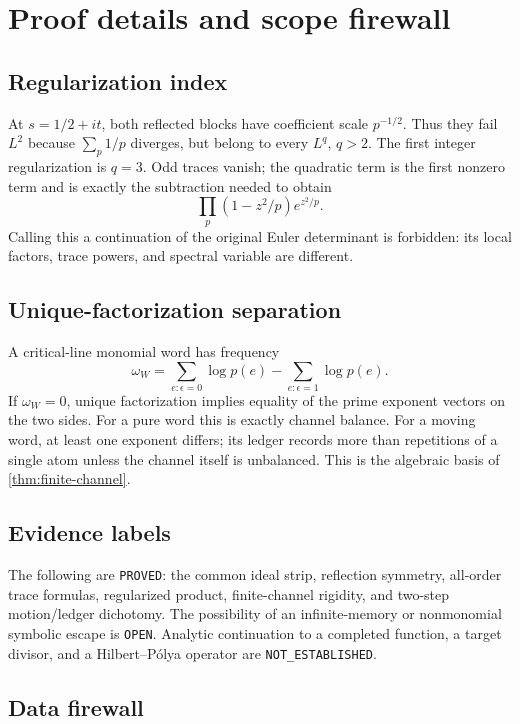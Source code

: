 \section{Proof details and scope firewall}
\label{app:scope}

\subsection{Regularization index}

At $s=1/2+it$, both reflected blocks have coefficient scale $p^{-1/2}$.
Thus they fail $L^2$ because $\sum_p1/p$ diverges, but belong to every
$L^q$, $q>2$.  The first integer regularization is $q=3$.  Odd traces vanish;
the quadratic term is the first nonzero term and is exactly the subtraction
needed to obtain
\[
 \prod_p(1-z^2/p)e^{z^2/p}.
\]
Calling this a continuation of the original Euler determinant is forbidden:
its local factors, trace powers, and spectral variable are different.

\subsection{Unique-factorization separation}

A critical-line monomial word has frequency
\[
 \omega_W=\sum_{e:\epsilon=0}\log p(e)
 -\sum_{e:\epsilon=1}\log p(e).
\]
If $\omega_W=0$, unique factorization implies equality of the prime exponent
vectors on the two sides.  For a pure word this is exactly channel balance.
For a moving word, at least one exponent differs; its ledger records more
than repetitions of a single atom unless the channel itself is unbalanced.
This is the algebraic basis of \cref{thm:finite-channel}.

\subsection{Evidence labels}

The following are \texttt{PROVED}: the common ideal strip, reflection
symmetry, all-order trace formulas, regularized product, finite-channel
rigidity, and two-step motion/ledger dichotomy.  The possibility of an
infinite-memory or nonmonomial symbolic escape is \texttt{OPEN}.  Analytic
continuation to a completed function, a target divisor, and a Hilbert--P\'olya
operator are \texttt{NOT\_ESTABLISHED}.

\subsection{Data firewall}

